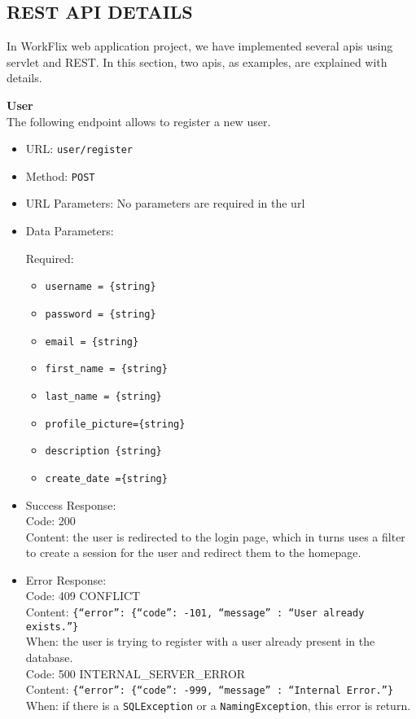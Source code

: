 \subsection{REST API DETAILS}

In WorkFlix web application project, we have implemented several apis using servlet and REST. In this section, two apis, as examples, are explained with details.


\noindent\textbf{User}\\
The following endpoint allows to register a new user.

\begin{itemize}
    \item URL: \texttt{user/register}
    \item Method: \texttt{POST}
    \item URL Parameters: No parameters are required in the url
    \item Data Parameters:
    
    Required:
    
    \begin{itemize}
        \item \texttt{username = \{string\}}
        \item \texttt{password = \{string\}}
        \item \texttt{email = \{string\}}
        \item \texttt{first\_name = \{string\}}
        \item \texttt{last\_name = \{string\}}
        \item \texttt{profile\_picture=\{string\}}
        \item \texttt{description \{string\}}
        \item \texttt{create\_date =\{string\}}
    \end{itemize}
    
    
    \item Success Response:\\
    
    Code: 200\\
    Content: the user is redirected to the login page, which in turns uses a filter to create a session for the user and redirect them to the homepage.\\

    \item Error Response:\\
    
    Code: 409 CONFLICT\\
    Content: \texttt{\{``error'': \{``code'': -101, ``message'' : ``User already exists.''\}}\\
    When: the user is trying to register with a user already present in the database.\\

    Code: 500 INTERNAL\_SERVER\_ERROR\\
    Content: \texttt{\{``error'': \{``code'': -999, ``message'' : ``Internal Error.''\}}\\
    When: if there is a \texttt{SQLException} or a \texttt{NamingException}, this error is return.\\
    
\end{itemize}


